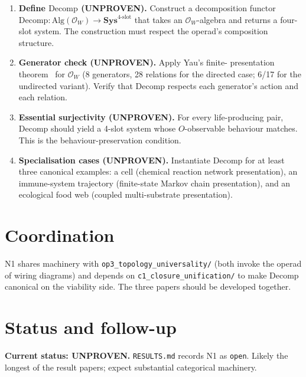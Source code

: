 \documentclass[11pt]{article}
\theoremstyle{plain}
\theoremstyle{definition}
\begin{document}
\begin{enumerate}[leftmargin=2em,itemsep=4pt]
  \item \textbf{Define $\mathrm{Decomp}$ (UNPROVEN).} Construct a
    decomposition functor
    $\mathrm{Decomp}: \mathrm{Alg}(\mathcal{O}_W) \to \mathbf{Sys}^{4\text{-slot}}$
    that takes an $\mathcal{O}_W$-algebra and returns a four-slot
    system. The construction must respect the operad's composition
    structure.
  \item \textbf{Generator check (UNPROVEN).} Apply Yau's finite-
    presentation theorem~\cite{yau2018operads} for $\mathcal{O}_W$
    (8 generators, 28 relations for the directed case; 6/17 for the
    undirected variant). Verify that $\mathrm{Decomp}$ respects each
    generator's action and each relation.
  \item \textbf{Essential surjectivity (UNPROVEN).} For every
    life-producing pair, $\mathrm{Decomp}$ should yield a 4-slot
    system whose $O$-observable behaviour matches. This is the
    behaviour-preservation condition.
  \item \textbf{Specialisation cases (UNPROVEN).} Instantiate
    $\mathrm{Decomp}$ for at least three canonical examples: a cell
    (chemical reaction network presentation), an immune-system
    trajectory (finite-state Markov chain presentation), and an
    ecological food web (coupled multi-substrate presentation).
\end{enumerate}

\section{Coordination}

N1 shares machinery with \texttt{op3\_topology\_universality/} (both
invoke the operad of wiring diagrams) and depends on
\texttt{c1\_closure\_unification/}
to make $\mathrm{Decomp}$ canonical on the viability side. The three
papers should be developed together.

\section{Status and follow-up}

\textbf{Current status: UNPROVEN.} \texttt{RESULTS.md} records N1 as
\texttt{open}. Likely the longest of the result papers; expect
substantial categorical machinery.



\end{document}
